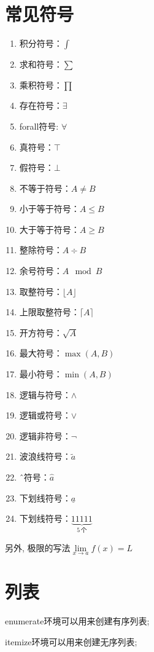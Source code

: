 \documentclass{MathNoteCN}
\begin{document}
\section{常见符号}

\begin{enumerate}
    \item 积分符号：$\int$
    \item 求和符号：$\sum$
    \item 乘积符号：$\prod$
    \item 存在符号：$\exists$
    \item forall符号: $\forall$
    \item 真符号：$\top$
    \item 假符号：$\bot$
    \item 不等于符号：$A\ne B$
    \item 小于等于符号：$A\le B$
    \item 大于等于符号：$A\ge B$
    \item 整除符号：$A\div B$
    \item 余号符号：$A\mod B$
    \item 取整符号：$\lfloor A \rfloor$
    \item 上限取整符号：$\lceil A \rceil$
    \item 开方符号：$\sqrt{A}$
    \item 最大符号：$\max(A,B)$
    \item 最小符号：$\min(A,B)$
    \item 逻辑与符号：$\land$
    \item 逻辑或符号：$\lor$
    \item 逻辑非符号：$\lnot$
    \item 波浪线符号：$\tilde{a}$
    \item ˆ符号：$\hat{a}$
    \item 下划线符号：$\underline{a}$
    \item 下划线符号：$\underbrace{11111}_{5\, \text{个}}$
\end{enumerate}

另外, 极限的写法$\lim\limits_{x\to a}f(x)=L$

\section{列表}
enumerate环境可以用来创建有序列表; 

itemize环境可以用来创建无序列表;
\end{document}
